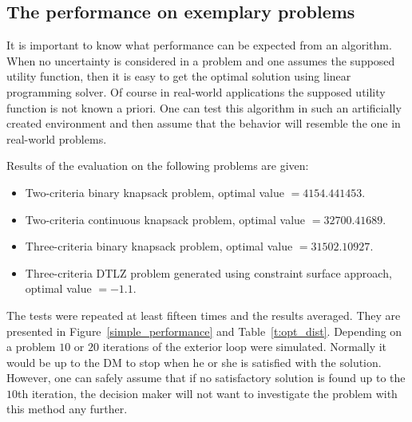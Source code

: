 \clearpage{}
\subsection{The performance on exemplary problems}
\label{nouncert-performance}
It is important to know what performance can be expected from an
algorithm. When no uncertainty is considered in a problem and one assumes the
supposed utility function, then it is easy to get the optimal solution using
linear programming solver. Of course in real-world applications the supposed
utility function is not known a priori. One can test this algorithm in such an
artificially created environment and then assume that the behavior will
resemble the one in real-world problems.

Results of the evaluation on the following problems are given:
\begin{itemize}
\item Two-criteria binary knapsack problem, optimal value $= 4154.441453$.
\item Two-criteria continuous knapsack problem, optimal value $= 32700.41689$.
\item Three-criteria binary knapsack problem, optimal value $= 31502.10927$.
\item Three-criteria DTLZ problem generated using constraint surface approach, optimal value $= -1.1$.
\end{itemize}

The tests were repeated at least fifteen times and the results averaged. They
are presented in Figure~\ref{simple_performance} and
Table~\ref{t:opt_dist}. Depending on a problem $10$ or $20$ iterations of the
exterior loop were simulated. Normally it would be up to the DM to stop when
he or she is satisfied with the solution. However, one can safely assume that
if no satisfactory solution is found up to the $10$th iteration, the decision
maker will not want to investigate the problem with this method any further.

